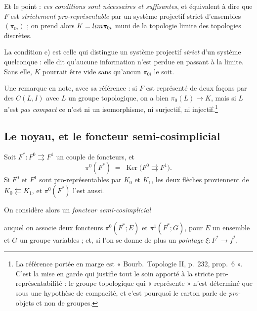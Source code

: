 \documentclass[11pt,a4paper]{article}
\begin{document}
Et le point : \emph{ces conditions sont nécessaires et suffisantes}, et
équivalent à dire que $F$ est \emph{strictement pro-représentable} par un
système projectif strict d'ensembles $(\pi_{0i})$ ; on prend alors
$K = \varprojlim \pi_{0i}$ muni de la topologie limite des topologies discrètes.

La condition c) est celle qui distingue un système projectif \emph{strict} d'un
système quelconque : elle dit qu'aucune information n'est perdue en passant à
la limite. Sans elle, $K$ pourrait être vide sans qu'aucun $\pi_{0i}$ le soit.

Une remarque en note, avec sa référence : si $F$ est représenté de deux façons
par des $C(L, I)$ avec $L$ un groupe topologique, on a bien
$\pi_{0}(L) \to K$, mais si $L$ n'est \emph{pas compact} ce n'est ni un
isomorphisme, ni surjectif, ni injectif.\footnote{La référence portée en marge
est « Bourb.\ Topologie II, p.\ 232, prop.\ 6 ». C'est la mise en garde qui
justifie tout le soin apporté à la stricte pro-représentabilité : le groupe
topologique qui « représente » n'est déterminé que sous une hypothèse de
compacité, et c'est pourquoi le carton parle de \emph{pro}-objets et non de
groupes.}

\subsection*{Le noyau, et le foncteur semi-cosimplicial}

Soit $F^{*} : F^{0} \rightrightarrows F^{1}$ un couple de foncteurs, et
\[
  \pi^{0}(F^{*}) \;=\; \operatorname{Ker}\bigl(F^{0} \rightrightarrows
  F^{1}\bigr) .
\]
Si $F^{0}$ et $F^{1}$ sont pro-représentables par $K_{0}$ et $K_{1}$, les deux
flèches proviennent de $K_{0} \leftleftarrows K_{1}$, et $\pi^{0}(F^{*})$ l'est
aussi.

On considère alors un \emph{foncteur semi-cosimplicial}


auquel on associe deux foncteurs $\pi^{0}(F^{*}; E)$ et $\pi^{1}(F^{*}; G)$,
pour $E$ un ensemble et $G$ un groupe variables ; et, si l'on se donne de plus
un \emph{pointage} $\xi : F^{*} \to f^{*}$,

\end{document}
